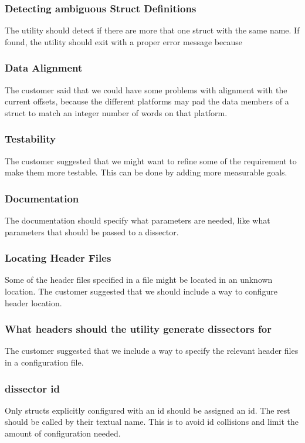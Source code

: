 {{\subsubsection{Detecting ambiguous \gls{Struct} Definitions}
The \gls{utility} should detect if there are more that one \gls{struct} with the same name. If found, the \gls{utility} should exit with a proper error message because 

\subsubsection{Data Alignment}
The customer said that we could have some problems with alignment with the current offsets, because the different platforms may pad the data \glspl{member} of a \gls{struct} to match an \gls{integer} number of words on that platform.

\subsubsection{Testability}
The customer suggested that we might want to refine some of the requirement to make them more testable. This can be done by adding more measurable goals.

\subsubsection{Documentation}
The documentation should specify what parameters are needed, like what parameters that should be passed to a \gls{dissector}.

\subsubsection{Locating \gls{Header} Files}
Some of the \gls{header} files specified in a file might be located in an unknown location. The customer suggested that we should include a way to configure \gls{header} location.

\subsubsection{What \glspl{header} should the \gls{utility} generate \glspl{dissector} for}
The customer suggested that we include a way to specify the relevant \gls{header} files in a configuration file.

\subsubsection{\Gls{dissector} id}
Only \glspl{struct} explicitly configured with an id should be assigned an id. The rest should be called by their textual name. This is to avoid id collisions and limit the amount of configuration needed.

}}
